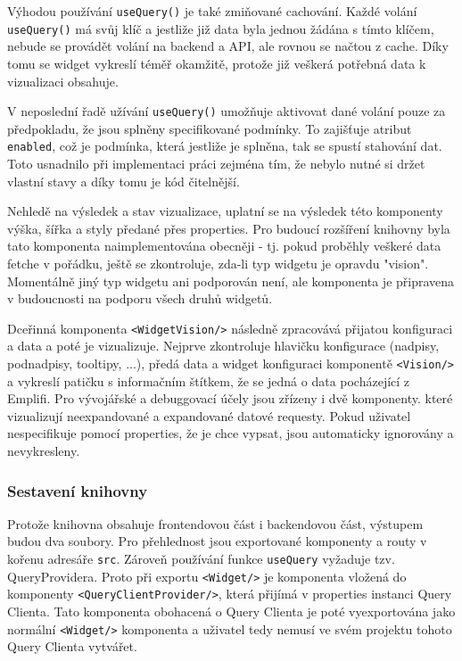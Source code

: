 \documentclass[czech, bc, kiv, he, iso690numb]{fasthesis}
\begin{document}
Výhodou používání \texttt{useQuery()} je také zmiňované cachování. Každé volání \texttt{useQuery()} má svůj klíč a jestliže již data byla jednou žádána s tímto klíčem,
nebude se provádět volání na backend a API, ale rovnou se načtou z cache. Díky tomu se widget vykreslí téměř okamžitě, protože již veškerá potřebná data k vizualizaci obsahuje. 

V neposlední řadě užívání \texttt{useQuery()} umožňuje aktivovat dané volání pouze za předpokladu, že jsou splněny specifikované podmínky. To zajišťuje atribut \texttt{enabled},
což je podmínka, která jestliže je splněna, tak se spustí stahování dat. Toto usnadnilo při implementaci práci zejména tím, že nebylo nutné si držet vlastní stavy a díky tomu
je kód čitelnější.

Nehledě na výsledek a stav vizualizace, uplatní se na výsledek této komponenty výška, šířka a styly předané přes properties. Pro budoucí rozšíření knihovny byla tato komponenta
naimplementována obecněji - tj. pokud proběhly veškeré data fetche v pořádku, ještě se zkontroluje, zda-li typ widgetu je opravdu "vision". Momentálně jiný typ widgetu ani podporován není,
ale komponenta je připravena v budoucnosti na podporu všech druhů widgetů.


Dceřinná komponenta \texttt{<WidgetVision/>} následně zpracovává přijatou konfiguraci a data a poté je vizualizuje. Nejprve zkontroluje hlavičku konfigurace (nadpisy, podnadpisy, tooltipy, ...),
předá data a widget konfiguraci komponentě \texttt{<Vision/>} a vykreslí patičku s informačním štítkem, že se jedná o data pocházející z Emplifi. Pro vývojářské a debuggovací účely jsou 
zřízeny i dvě komponenty. které vizualizují neexpandované a expandované datové requesty. Pokud uživatel nespecifikuje pomocí properties, že je chce vypsat, jsou automaticky ignorovány a nevykresleny.

\subsubsection{Sestavení knihovny}

Protože knihovna obsahuje frontendovou část i backendovou část, výstupem budou dva soubory. Pro přehlednost jsou exportované komponenty a routy v kořenu adresáře \texttt{src}. Zároveň používání
funkce \texttt{useQuery} vyžaduje tzv. QueryProvidera. Proto při exportu \texttt{<Widget/>} je komponenta vložená do komponenty \texttt{<QueryClientProvider/>}, která přijímá v properties instanci
Query Clienta. Tato komponenta obohacená o Query Clienta je poté vyexportována jako normální \texttt{<Widget/>} komponenta a uživatel tedy nemusí ve svém projektu tohoto Query Clienta vytvářet.
\end{document}
